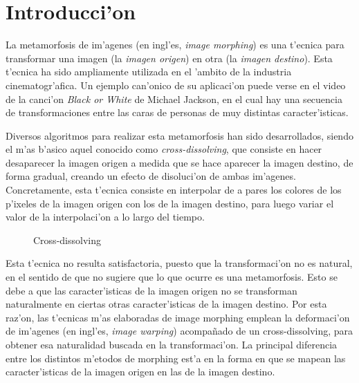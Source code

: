 \section{Introducci'on}

La metamorfosis de im'agenes (en ingl'es, \textit{image morphing}) es una t'ecnica para transformar una imagen (la \textit{imagen origen}) en otra (la \textit{imagen destino}). Esta t'ecnica ha sido ampliamente utilizada en el 'ambito de la industria cinematogr'afica. Un ejemplo can'onico de su aplicaci'on puede verse en el video de la canci'on \textit{Black or White} de Michael Jackson, en el cual hay una secuencia de transformaciones entre las caras de personas de muy distintas caracter'isticas.

Diversos algoritmos para realizar esta metamorfosis han sido desarrollados, siendo el m'as b'asico aquel conocido como \textit{cross-dissolving}, que consiste en hacer desaparecer la imagen origen a medida que se hace aparecer la imagen destino, de forma gradual, creando un efecto de disoluci'on de ambas im'agenes. Concretamente, esta t'ecnica consiste en interpolar de a pares los colores de los p'ixeles de la imagen origen con los de la imagen destino, para luego variar el valor de la interpolaci'on a lo largo del tiempo.

\begin{figure}[H]
	\begin{center}
	\end{center}		
	\caption{Cross-dissolving}
	\label{fig1}
\end{figure}

Esta t'ecnica no resulta satisfactoria, puesto que la transformaci'on no es natural, en el sentido de que no sugiere que lo que ocurre es una metamorfosis. Esto se debe a que las caracter'isticas de la imagen origen no se transforman naturalmente en ciertas otras caracter'isticas de la imagen destino. Por esta raz'on, las t'ecnicas m'as elaboradas de image morphing emplean la deformaci'on de im'agenes (en ingl'es, \textit{image warping}) acompa\~{n}ado de un cross-dissolving, para obtener esa naturalidad buscada en la transformaci'on. La principal diferencia entre los distintos m'etodos de morphing est'a en la forma en que se mapean las caracter'isticas de la imagen origen en las de la imagen destino.

